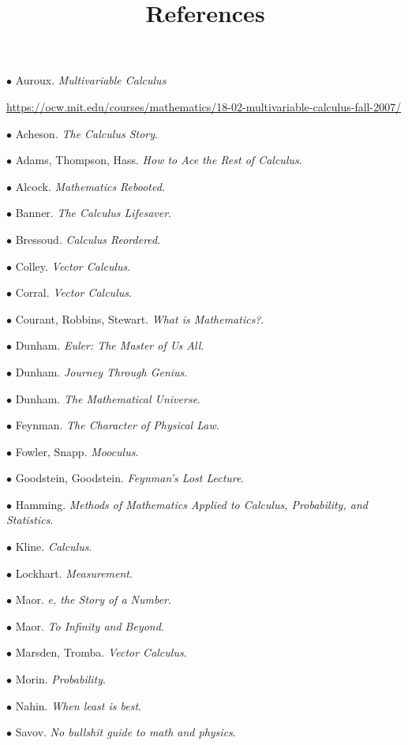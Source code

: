 \documentclass[11pt, oneside]{article}   	%
\title{References}
\date{}
\begin{document}
\maketitle
\Large


$\bullet$ Auroux.  \emph{Multivariable Calculus}

\url{https://ocw.mit.edu/courses/mathematics/18-02-multivariable-calculus-fall-2007/}

$\bullet$ Acheson.  \emph{The Calculus Story}.

$\bullet$ Adams, Thompson, Hass. \emph{How to Ace the Rest of Calculus}.

$\bullet$ Alcock. \emph{Mathematics Rebooted}.

$\bullet$ Banner. \emph{The Calculus Lifesaver}.

$\bullet$ Bressoud. \emph{Calculus Reordered}.

$\bullet$ Colley. \emph{Vector Calculus}.

$\bullet$ Corral. \emph{Vector Calculus}.

$\bullet$ Courant, Robbins, Stewart. \emph{What is Mathematics?}.

$\bullet$ Dunham. \emph{Euler:  The Master of Us All}.

$\bullet$ Dunham. \emph{Journey Through Genius}.

$\bullet$ Dunham. \emph{The Mathematical Universe}.

$\bullet$ Feynman. \emph{The Character of Physical Law}.

$\bullet$ Fowler, Snapp. \emph{Mooculus}.

$\bullet$ Goodstein, Goodstein. \emph{Feynman's Lost Lecture}.

$\bullet$ Hamming.  \emph{Methods of Mathematics Applied to Calculus, Probability, and Statistics}.

$\bullet$ Kline. \emph{Calculus}.

$\bullet$ Lockhart. \emph{Measurement}.

$\bullet$ Maor. \emph{e, the Story of a Number}.

$\bullet$ Maor. \emph{To Infinity and Beyond}.

$\bullet$ Marsden, Tromba. \emph{Vector Calculus}.

$\bullet$ Morin. \emph{Probability}.

$\bullet$ Nahin. \emph{When least is best}.

$\bullet$ Savov. \emph{No bullshit guide to math and physics}.
\end{document}
